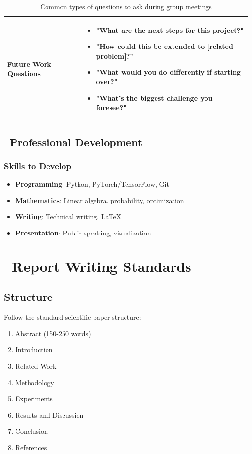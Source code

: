 \documentclass[11pt,a4paper]{article}
\begin{document}
\begin{table}[h!]
\begin{tabular}{|p{3.5cm}|p{11cm}|}
\hline
\textbf{Future Work Questions} & 
\begin{itemize}[leftmargin=*,noitemsep,topsep=0pt]
    \item "What are the next steps for this project?"
    \item "How could this be extended to [related problem]?"
    \item "What would you do differently if starting over?"
    \item "What's the biggest challenge you foresee?"
\end{itemize} \\
\hline
\end{tabular}
\caption{Common types of questions to ask during group meetings}
\label{tab:question-types}
\end{table}



\subsection{\faGraduationCap~Professional Development}

\subsubsection{Skills to Develop}
\begin{itemize}
    \item \textbf{Programming}: Python, PyTorch/TensorFlow, Git
    \item \textbf{Mathematics}: Linear algebra, probability, optimization
    \item \textbf{Writing}: Technical writing, LaTeX
    \item \textbf{Presentation}: Public speaking, visualization
\end{itemize}


\section{\faPenFancy~Report Writing Standards}

\subsection{Structure}
Follow the standard scientific paper structure:
\begin{enumerate}
    \item Abstract (150-250 words)
    \item Introduction
    \item Related Work
    \item Methodology
    \item Experiments
    \item Results and Discussion
    \item Conclusion
    \item References
\end{enumerate}
\end{document}
